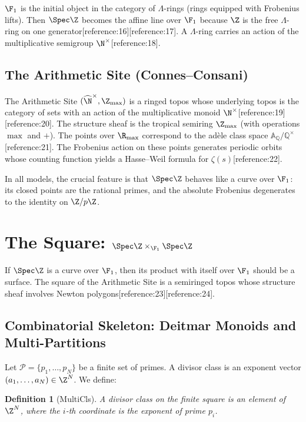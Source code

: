 \documentclass[11pt,a4paper]{article}
\newtheorem{definition}[theorem]{Definition}
\begin{document}
$\F_1$ is the initial object in the category of $\Lambda$-rings (rings equipped with Frobenius lifts). Then $\Spec \Z$ becomes the affine line over $\F_1$ because $\Z$ is the free $\Lambda$-ring on one generator[reference:16][reference:17]. A $\Lambda$-ring carries an action of the multiplicative semigroup $\N^\times$[reference:18].

\subsection{The Arithmetic Site (Connes--Consani)}

The Arithmetic Site $(\widehat{\N}^{\times}, \Z_{\max})$ is a ringed topos whose underlying topos is the category of sets with an action of the multiplicative monoid $\N^\times$[reference:19][reference:20]. The structure sheaf is the tropical semiring $\Z_{\max}$ (with operations $\max$ and $+$). The points over $\R_{\max}$ correspond to the ad\`ele class space $\mathbb{A}_{\mathbb{Q}}/\mathbb{Q}^{\times}$[reference:21]. The Frobenius action on these points generates periodic orbits whose counting function yields a Hasse--Weil formula for $\zeta(s)$[reference:22].

In all models, the crucial feature is that $\Spec \Z$ behaves like a curve over $\F_1$: its closed points are the rational primes, and the absolute Frobenius degenerates to the identity on $\Z/p\Z$.

\section{The Square: $\Spec \Z \times_{\F_1} \Spec \Z$}

If $\Spec \Z$ is a curve over $\F_1$, then its product with itself over $\F_1$ should be a surface. The square of the Arithmetic Site is a semiringed topos whose structure sheaf involves Newton polygons[reference:23][reference:24].

\subsection{Combinatorial Skeleton: Deitmar Monoids and Multi-Partitions}

Let $\mathcal{P} = \{p_1, \dots, p_N\}$ be a finite set of primes. A divisor class is an exponent vector $(a_1, \dots, a_N) \in \Z^N$. We define:

\begin{definition}[MultiCls]
A divisor class on the finite square is an element of $\Z^N$, where the $i$-th coordinate is the exponent of prime $p_i$.
\end{definition}
\end{document}
